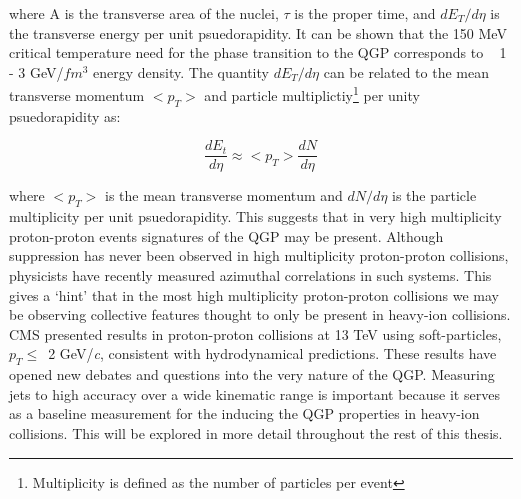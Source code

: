 \noindent
where A is the transverse area of the nuclei, $\tau$ is the proper time, and $dE_{T}/d \eta$ is the transverse energy per unit psuedorapidity.  It can be shown that  the 150 MeV critical temperature need for the phase transition to the QGP corresponds to ~ 1 - 3 GeV/$fm^{3}$ energy density.  The quantity $dE_{T}/d \eta$ can be related to the mean transverse momentum $<p_{T}>$ and particle multiplictiy\footnote{Multiplicity is defined as the number of particles per event} per unity psuedorapidity as:

\begin{equation}
\frac{dE_{t}}{d \eta}  \approx  <p_{T}> \frac{dN}{d\eta}
\label{eq:Et}
\end{equation}

\noindent
where $ <p_{T} >$ is the mean transverse momentum and $dN/d\eta$ is the particle multiplicity per unit psuedorapidity.  This suggests that in very high multiplicity proton-proton events signatures of the QGP may be present.  Although suppression has never been observed in high multiplicity proton-proton collisions, physicists have recently measured azimuthal correlations in such systems\cite{Nagle:2018nvi}.  This gives a `hint' that in the most high multiplicity proton-proton collisions we may be observing collective features thought to only be present in heavy-ion collisions.  CMS presented results in proton-proton collisions at 13 TeV using soft-particles, $p_{T} \leq\,$ 2 GeV/\textit{c}, consistent with hydrodynamical predictions\cite{ZHAO2018495}. These results have opened new debates and questions into the very nature of the QGP.  Measuring jets to high accuracy over a wide kinematic range is important because it serves as a baseline measurement for the inducing the QGP properties in heavy-ion collisions.  This will be explored in more detail throughout the rest of this thesis.